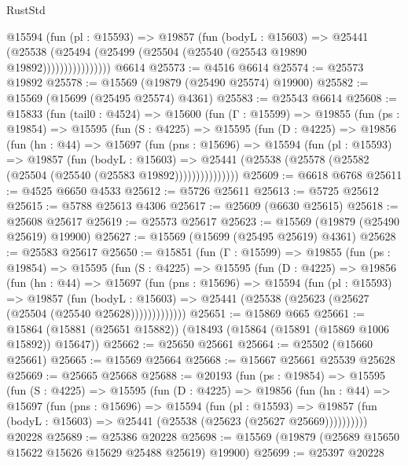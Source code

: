 \begin{lexlean}{RustStd}
\begin{coremodule}
                  @15594
                    (fun (pl : @15593) =>
                    @19857
                      (fun (bodyL : @15603) =>
                      @25441
                        (@25538
                          (@25494 (@25499 (@25504 (@25540 (@25543 @19890 @19892))))))))))))))))
    @6614
@25573 := @4516 @6614
@25574 := @25573 @19892
@25578 := @15569 (@19879 (@25490 @25574) @19900)
@25582 := @15569 (@15699 (@25495 @25574) @4361)
@25583 := @25543 @6614
@25608 := @15833
    (fun (tail0 : @4524) =>
    @15600
      (fun (Γ : @15599) =>
      @19855
        (fun (ps : @19854) =>
        @15595
          (fun (S : @4225) =>
          @15595
            (fun (D : @4225) =>
            @19856
              (fun (hn : @44) =>
              @15697
                (fun (pns : @15696) =>
                @15594
                  (fun (pl : @15593) =>
                  @19857
                    (fun (bodyL : @15603) =>
                    @25441 (@25538 (@25578 (@25582 (@25504 (@25540 (@25583 @19892)))))))))))))))
@25609 := @6618 @6768
@25611 := @4525 @6650 @4533
@25612 := @5726 @25611
@25613 := @5725 @25612
@25615 := @5788 @25613 @4306
@25617 := @25609 (@6630 @25615)
@25618 := @25608 @25617
@25619 := @25573 @25617
@25623 := @15569 (@19879 (@25490 @25619) @19900)
@25627 := @15569 (@15699 (@25495 @25619) @4361)
@25628 := @25583 @25617
@25650 := @15851
    (fun (Γ : @15599) =>
    @19855
      (fun (ps : @19854) =>
      @15595
        (fun (S : @4225) =>
        @15595
          (fun (D : @4225) =>
          @19856
            (fun (hn : @44) =>
            @15697
              (fun (pns : @15696) =>
              @15594
                (fun (pl : @15593) =>
                @19857
                  (fun (bodyL : @15603) =>
                  @25441 (@25538 (@25623 (@25627 (@25504 (@25540 @25628)))))))))))))
@25651 := @15869 @665
@25661 := @15864 (@15881 (@25651 @15882)) (@18493 (@15864 (@15891 (@15869 @1006 @15892)) @15647))
@25662 := @25650 @25661
@25664 := @25502 (@15660 @25661)
@25665 := @15569 @25664
@25668 := @15667 @25661 @25539 @25628
@25669 := @25665 @25668
@25688 := @20193
    (fun (ps : @19854) =>
    @15595
      (fun (S : @4225) =>
      @15595
        (fun (D : @4225) =>
        @19856
          (fun (hn : @44) =>
          @15697
            (fun (pns : @15696) =>
            @15594
              (fun (pl : @15593) =>
              @19857 (fun (bodyL : @15603) => @25441 (@25538 (@25623 (@25627 @25669))))))))))
    @20228
@25689 := @25386 @20228
@25698 := @15569 (@19879 (@25689 @15650 @15622 @15626 @15629 @25488 @25619) @19900)
@25699 := @25397 @20228

\end{coremodule}
\end{lexlean}
